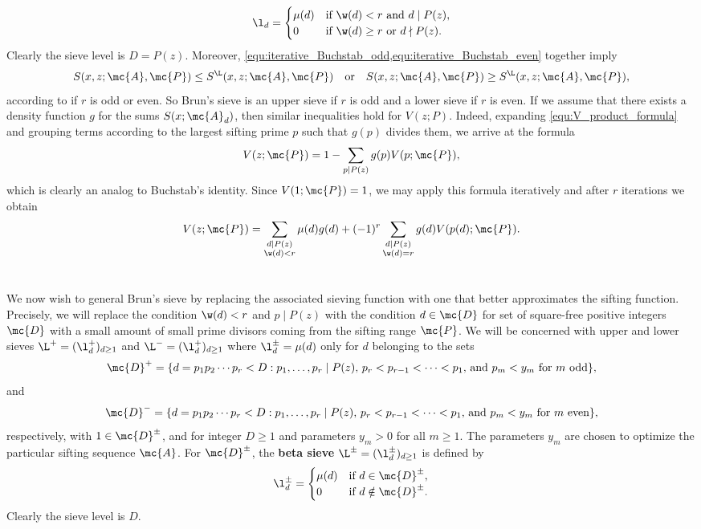     \[
      \l_{d} = \begin{cases} \mu(d) & \text{if $\w(d) < r$ and $d \mid P(z)$}, \\ 0 & \text{if $\w(d) \ge r$ or $d \nmid P(z)$}. \end{cases}
    \]
    Clearly the sieve level is $D = P(z)$. Moreover, \cref{equ:iterative_Buchstab_odd,equ:iterative_Buchstab_even} together imply
    \[
      S(x,z;\mc{A},\mc{P}) \le S^{\L}(x,z;\mc{A},\mc{P}) \quad \text{or} \quad S(x,z;\mc{A},\mc{P}) \ge S^{\L}(x,z;\mc{A},\mc{P}),
    \]
    according to if $r$ is odd or even. So Brun's sieve is an upper sieve if $r$ is odd and a lower sieve if $r$ is even. If we assume that there exists a density function $g$ for the sums $S(x;\mc{A}_{d})$, then similar inequalities hold for $V(z;P)$. Indeed, expanding \cref{equ:V_product_formula} and grouping terms according to the largest sifting prime $p$ such that $g(p)$ divides them, we arrive at the formula
    \[
      V(z;\mc{P}) = 1-\sum_{p \mid P(z)}g(p)V(p;\mc{P}),
    \]
    which is clearly an analog to Buchstab's identity. Since $V(1;\mc{P}) = 1$, we may apply this formula iteratively and after $r$ iterations we obtain
    \[
      V(z;\mc{P}) = \sum_{\substack{d \mid P(z) \\ \w(d) < r}}\mu(d)g(d)+(-1)^{r}\sum_{\substack{d \mid P(z) \\ \w(d) = r}}g(d)V(p(d);\mc{P}).
    \]
  \section{}
    We now wish to general Brun's sieve by replacing the associated sieving function with one that better approximates the sifting function. Precisely, we will replace the condition $\w(d) < r$ and $p \mid P(z)$ with the condition $d \in \mc{D}$ for set of square-free positive integers $\mc{D}$ with a small amount of small prime divisors coming from the sifting range $\mc{P}$. We will be concerned with upper and lower sieves $\L^{+} = (\l_{d}^{+})_{d \ge 1}$ and $\L^{-} = (\l_{d}^{+})_{d \ge 1}$ where $\l_{d}^{\pm} = \mu(d)$ only for $d$ belonging to the sets
    \[
      \mc{D}^{+} = \{d = p_{1}p_{2} \cdots p_{r} < D:\text{$p_{1},\ldots,p_{r} \mid P(z)$, $p_{r} < p_{r-1} < \cdots < p_{1}$, and $p_{m} < y_{m}$ for $m$ odd}\},
    \]
    and
    \[
      \mc{D}^{-} = \{d = p_{1}p_{2} \cdots p_{r} < D:\text{$p_{1},\ldots,p_{r} \mid P(z)$, $p_{r} < p_{r-1} < \cdots < p_{1}$, and $p_{m} < y_{m}$ for $m$ even}\},
    \]
    respectively, with $1 \in \mc{D}^{\pm}$, and for integer $D \ge 1$ and parameters $y_{m} > 0$ for all $m \ge 1$. The parameters $y_{m}$ are chosen to optimize the particular sifting sequence $\mc{A}$. For $\mc{D}^{\pm}$, the \textbf{beta sieve} $\L^{\pm} = (\l_{d}^{\pm})_{d \ge 1}$ is defined by
    \[
      \l_{d}^{\pm} = \begin{cases} \mu(d) & \text{if $d \in \mc{D}^{\pm}$}, \\ 0 & \text{if $d \notin \mc{D}^{\pm}$}. \end{cases}
    \]
    Clearly the sieve level is $D$. 
    
